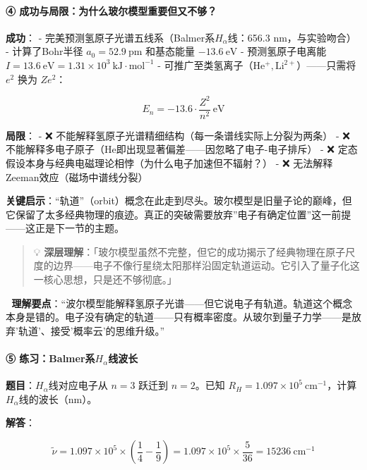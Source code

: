 \documentclass[a4paper,11pt]{ctexart}
\begin{document}
\paragraph{④ 成功与局限：为什么玻尔模型重要但又不够？}\label{ux6210ux529fux4e0eux5c40ux9650ux4e3aux4ec0ux4e48ux73bbux5c14ux6a21ux578bux91cdux8981ux4f46ux53c8ux4e0dux591f}

\textbf{成功}：
- 完美预测氢原子光谱五线系（Balmer系\(H_\alpha\)线：656.3 nm，与实验吻合）
- 计算了Bohr半径 \(a_0 = 52.9\ \mathrm{pm}\) 和基态能量 \(-13.6\ \mathrm{eV}\)
- 预测氢原子电离能 \(I = 13.6\ \mathrm{eV} = 1.31 \times 10^3\ \mathrm{kJ\cdot mol^{-1}}\)
- 可推广至类氢离子（\(\mathrm{He^+, Li^{2+}}\)）------只需将 \(e^2\) 换为 \(Ze^2\)：

\[E_n = -13.6 \cdot \frac{Z^2}{n^2}\ \mathrm{eV}\]

\textbf{局限}：
- ❌ 不能解释氢原子光谱精细结构（每一条谱线实际上分裂为两条）
- ❌ 不能解释多电子原子（He即出现显著偏差------因忽略了电子-电子排斥）
- ❌ 定态假设本身与经典电磁理论相悖（为什么电子加速但不辐射？）
- ❌ 无法解释Zeeman效应（磁场中谱线分裂）

\textbf{关键启示}：``轨道''（orbit）概念在此走到尽头。玻尔模型是旧量子论的巅峰，但它保留了太多经典物理的痕迹。真正的突破需要放弃''电子有确定位置''这一前提------这正是下一节的主题。

\begin{quote}
💡 \textbf{深层理解}：「玻尔模型虽然不完整，但它的成功揭示了经典物理在原子尺度的边界------电子不像行星绕太阳那样沿固定轨道运动。它引入了量子化这一核心思想，只是还不够彻底。」
\end{quote}

📌 \textbf{理解要点}：``波尔模型能解释氢原子光谱------但它说电子有轨道。轨道这个概念本身是错的。电子没有确定的轨道------只有概率密度。从玻尔到量子力学------是放弃'轨道'、接受'概率云'的思维升级。''

\paragraph{\texorpdfstring{⑤ 练习：Balmer系\(H_\alpha\)线波长}{⑤ 练习：Balmer系H\_\textbackslash alpha线波长}}\label{ux7ec3ux4e60balmerux7cfbh_alphaux7ebfux6ce2ux957f}

\textbf{题目}：\(H_\alpha\)线对应电子从 \(n=3\) 跃迁到 \(n=2\)。已知 \(R_H = 1.097 \times 10^5\ \mathrm{cm^{-1}}\)，计算\(H_\alpha\)线的波长（nm）。

\textbf{解答}：

\[
\tilde{\nu} = 1.097\times 10^5 \times \left(\frac{1}{4} - \frac{1}{9}\right) = 1.097\times 10^5 \times \frac{5}{36} = 15236\ \mathrm{cm^{-1}}
\]
\end{document}
